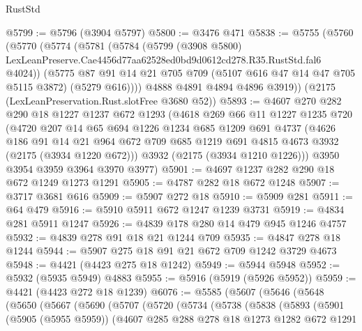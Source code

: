 \begin{lexlean}{RustStd}
\begin{coremodule}
@5799 := @5796 (@3904 @5797)
@5800 := @3476 @471
@5838 := @5755
    (@5760
      (@5770
        (@5774
          (@5781
            (@5784
              (@5799
                (@3908 @5800)
                LexLeanPreserve.Cae4456d77aa62528ed0bd9d0612cd278.R35.RustStd.fal6
                @4024))
            (@5775
              @87
              @91
              @14
              @21
              @705
              @709
              (@5107 @616 @47 @14 @47 @705 @5115 @3872)
              (@5279 @616))))
        @4888
        @4891
        @4894
        @4896
        @3919))
    (@2175 (LexLeanPreservation.Rust.slotFree @3680 @52))
@5893 := @4607
    @270
    @282
    @290
    @18
    @1227
    @1237
    @672
    @1293
    (@4618
      @269
      @66
      @11
      @1227
      @1235
      @720
      (@4720
        @207
        @14
        @65
        @694
        @1226
        @1234
        @685
        @1209
        @691
        @4737
        (@4626
          @186
          @91
          @14
          @21
          @964
          @672
          @709
          @685
          @1219
          @691
          @4815
          @4673
          @3932
          (@2175 (@3934 @1220 @672)))
        @3932
        (@2175 (@3934 @1210 @1226)))
      @3950
      @3954
      @3959
      @3964
      @3970
      @3977)
@5901 := @4697 @1237 @282 @290 @18 @672 @1249 @1273 @1291
@5905 := @4787 @282 @18 @672 @1248
@5907 := @3717 @3681 @616
@5909 := @5907 @272 @18
@5910 := @5909 @281
@5911 := @64 @479
@5916 := @5910 @5911 @672 @1247 @1239 @3731
@5919 := @4834 @281 @5911 @1247
@5926 := @4839 @178 @280 @14 @479 @945 @1246 @4757
@5932 := @4839 @278 @91 @18 @21 @1244 @709
@5935 := @4847 @278 @18 @1244
@5944 := @5907 @275 @18 @91 @21 @672 @709 @1242 @3729 @4673
@5948 := @4421 (@4423 @275 @18 @1242)
@5949 := @5944 @5948
@5952 := @5932 (@5935 @5949) @4883
@5955 := @5916 (@5919 (@5926 @5952))
@5959 := @4421 (@4423 @272 @18 @1239)
@6076 := @5585
    (@5607
      (@5646
        (@5648
          (@5650
            (@5667
              (@5690
                (@5707
                  (@5720
                    (@5734
                      (@5738
                        (@5838
                          (@5893
                            (@5901
                              (@5905 (@5955 @5959))
                              (@4607
                                @285
                                @288
                                @278
                                @18
                                @1273
                                @1282
                                @672
                                @1291

\end{coremodule}
\end{lexlean}

